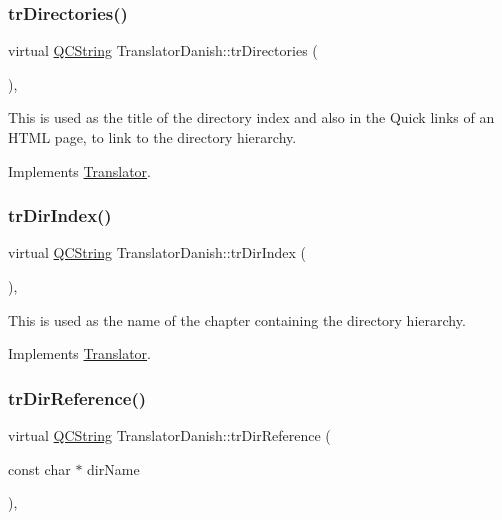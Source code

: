\mbox{\label{class_translator_danish_a58e73287fb67094c6dc1c8824d83217f}} 
\subsubsection{\texorpdfstring{trDirectories()}{trDirectories()}}
{\footnotesize\ttfamily virtual \mbox{\hyperlink{class_q_c_string}{Q\+C\+String}} Translator\+Danish\+::tr\+Directories (\begin{DoxyParamCaption}{ }\end{DoxyParamCaption})\hspace{0.3cm}{\ttfamily [inline]}, {\ttfamily [virtual]}}

This is used as the title of the directory index and also in the Quick links of an H\+T\+ML page, to link to the directory hierarchy. 

Implements \mbox{\hyperlink{class_translator}{Translator}}.

\mbox{\label{class_translator_danish_a78189c2d18b041d98b808b00052c8c00}} 
\subsubsection{\texorpdfstring{trDirIndex()}{trDirIndex()}}
{\footnotesize\ttfamily virtual \mbox{\hyperlink{class_q_c_string}{Q\+C\+String}} Translator\+Danish\+::tr\+Dir\+Index (\begin{DoxyParamCaption}{ }\end{DoxyParamCaption})\hspace{0.3cm}{\ttfamily [inline]}, {\ttfamily [virtual]}}

This is used as the name of the chapter containing the directory hierarchy. 

Implements \mbox{\hyperlink{class_translator}{Translator}}.

\mbox{\label{class_translator_danish_a730f238db6ef1b22b23610cd238991ec}} 
\subsubsection{\texorpdfstring{trDirReference()}{trDirReference()}}
{\footnotesize\ttfamily virtual \mbox{\hyperlink{class_q_c_string}{Q\+C\+String}} Translator\+Danish\+::tr\+Dir\+Reference (\begin{DoxyParamCaption}\item[{const char $\ast$}]{dir\+Name }\end{DoxyParamCaption})\hspace{0.3cm}{\ttfamily [inline]}, {\ttfamily [virtual]}}

